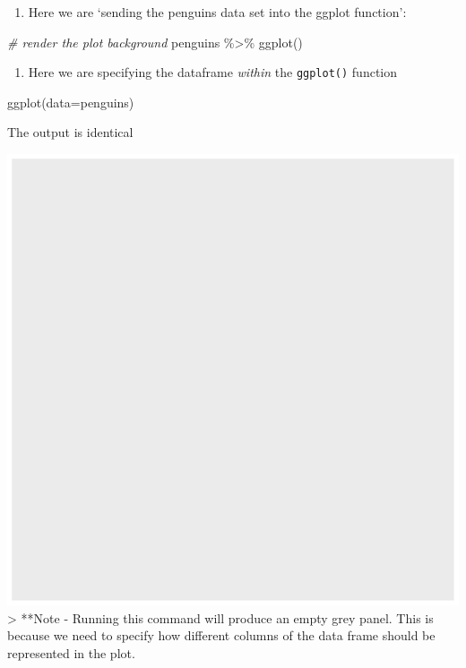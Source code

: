 \documentclass[
]{book}
\newenvironment{Shaded}{\begin{snugshade}}{\end{snugshade}}
\newcommand{\AttributeTok}[1]{\textcolor[rgb]{0.77,0.63,0.00}{#1}}
\newcommand{\CommentTok}[1]{\textcolor[rgb]{0.56,0.35,0.01}{\textit{#1}}}
\newcommand{\FunctionTok}[1]{\textcolor[rgb]{0.00,0.00,0.00}{#1}}
\newcommand{\NormalTok}[1]{#1}
\newcommand{\SpecialCharTok}[1]{\textcolor[rgb]{0.00,0.00,0.00}{#1}}
\providecommand{\tightlist}{%
  \setlength{\itemsep}{0pt}\setlength{\parskip}{0pt}}
\begin{document}
\begin{enumerate}
\def\labelenumi{\arabic{enumi})}
\tightlist
\item
  Here we are `sending the penguins data set into the ggplot function':
\end{enumerate}

\begin{Shaded}
\begin{Highlighting}[]
\CommentTok{\# render the plot background}
\NormalTok{penguins }\SpecialCharTok{\%\textgreater{}\%} 
  \FunctionTok{ggplot}\NormalTok{()}
\end{Highlighting}
\end{Shaded}

\begin{enumerate}
\def\labelenumi{\arabic{enumi})}
\setcounter{enumi}{1}
\tightlist
\item
  Here we are specifying the dataframe \emph{within} the \texttt{ggplot()} function
\end{enumerate}

\begin{Shaded}
\begin{Highlighting}[]
\FunctionTok{ggplot}\NormalTok{(}\AttributeTok{data=}\NormalTok{penguins)}
\end{Highlighting}
\end{Shaded}

The output is identical

\includegraphics[width=0.8\linewidth]{images/empty}
\textgreater{} **Note - Running this command will produce an empty grey panel. This is because we need to specify how different columns of the data frame should be represented in the plot.
\end{document}
